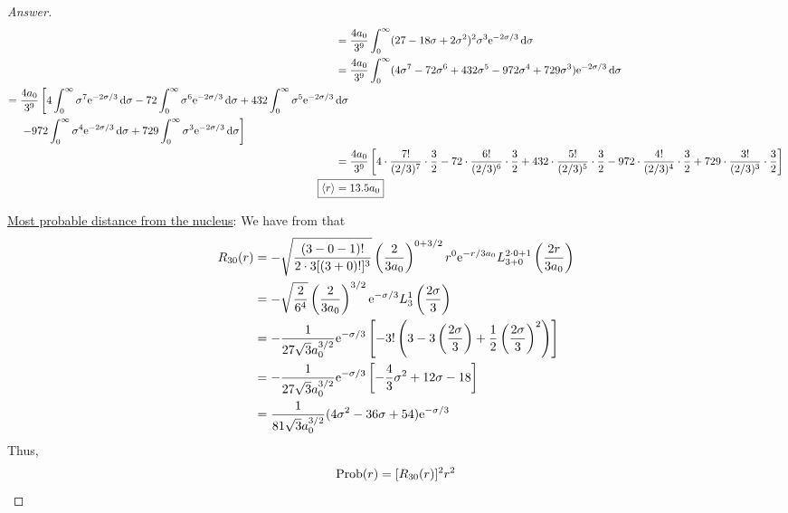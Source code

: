 \documentclass[../psets.tex]{subfiles}
\begin{document}
\begin{enumerate}
\begin{enumerate}
\begin{proof}[Answer]
\begin{align*}
                ={}& \frac{4a_0}{3^9}\int_0^\infty(27-18\sigma+2\sigma^2)^2\sigma^3\e[-2\sigma/3]\dd{\sigma}\\
                ={}& \frac{4a_0}{3^9}\int_0^\infty(4\sigma^7-72\sigma^6+432\sigma^5-972\sigma^4+729\sigma^3)\e[-2\sigma/3]\dd{\sigma}\\
                \begin{split}
                    ={}& \frac{4a_0}{3^9}\left[ 4\int_0^\infty\sigma^7\e[-2\sigma/3]\dd{\sigma}-72\int_0^\infty\sigma^6\e[-2\sigma/3]\dd{\sigma}+432\int_0^\infty\sigma^5\e[-2\sigma/3]\dd{\sigma}\right.\\
                    & \left.-972\int_0^\infty\sigma^4\e[-2\sigma/3]\dd{\sigma}+729\int_0^\infty\sigma^3\e[-2\sigma/3]\dd{\sigma} \right]
                \end{split}\\
                ={}& \frac{4a_0}{3^9}\left[ 4\cdot\frac{7!}{(2/3)^7}\cdot\frac{3}{2}-72\cdot\frac{6!}{(2/3)^6}\cdot\frac{3}{2}+432\cdot\frac{5!}{(2/3)^5}\cdot\frac{3}{2}-972\cdot\frac{4!}{(2/3)^4}\cdot\frac{3}{2}+729\cdot\frac{3!}{(2/3)^3}\cdot\frac{3}{2} \right]\\
                \Aboxed{\prb{r} ={}& 13.5a_0}
            \end{align*}\par
            \underline{Most probable distance from the nucleus}: We have from \textcite{bib:McQuarrieSimon} that
            \begin{align*}
                R_{30}(r) &= -\sqrt{\frac{(3-0-1)!}{2\cdot 3[(3+0)!]^3}}\left( \frac{2}{3a_0} \right)^{0+3/2}r^0\e[-r/3a_0]L_{3+0}^{2\cdot 0+1}\left( \frac{2r}{3a_0} \right)\\
                &= -\sqrt{\frac{2}{6^4}}\left( \frac{2}{3a_0} \right)^{3/2}\e[-\sigma/3]L_3^1\left( \frac{2\sigma}{3} \right)\\
                &= -\frac{1}{27\sqrt{3}a_0^{3/2}}\e[-\sigma/3]\left[ -3!\left( 3-3\left( \frac{2\sigma}{3} \right)+\frac{1}{2}\left( \frac{2\sigma}{3} \right)^2 \right) \right]\\
                &= -\frac{1}{27\sqrt{3}a_0^{3/2}}\e[-\sigma/3]\left[ -\frac{4}{3}\sigma^2+12\sigma-18 \right]\\
                &= \frac{1}{81\sqrt{3}a_0^{3/2}}(4\sigma^2-36\sigma+54)\e[-\sigma/3]
            \end{align*}
            Thus,
            \begin{align*}
                \Prob(r) &= [R_{30}(r)]^2r^2\\

\end{align*}
\end{proof}
\end{enumerate}
\end{enumerate}
\end{document}

